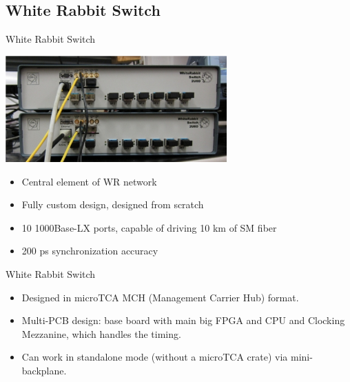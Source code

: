 \documentclass[xcolor=dvipsnames]{beamer}
\begin{document}


\subsection {White Rabbit Switch}


\begin{frame}{White Rabbit Switch}
\begin{center}
\includegraphics[width=8.5cm]{../../figures/switch/old_switches2.jpg}
\end{center}
\begin{itemize}
\item Central element of WR network
\item Fully custom design, designed from scratch
\item 10 1000Base-LX ports, capable of driving 10 km of SM fiber
\item 200 ps synchronization accuracy
\end{itemize}
\end{frame}

\begin{frame}{White Rabbit Switch}
\begin{itemize}
\item Designed in microTCA MCH (Management Carrier Hub) format.
\item Multi-PCB design: base board with main big FPGA and CPU and Clocking Mezzanine, which handles the timing.
\item Can work in standalone mode (without a microTCA crate) via mini-backplane.
\end{itemize}
\end{frame}
\end{document}
